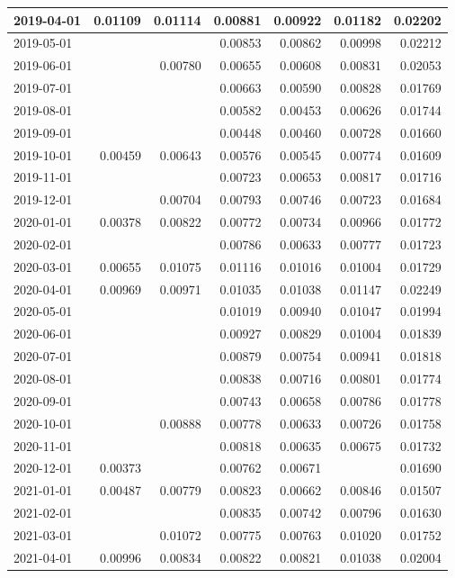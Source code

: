 \documentclass[
]{book}
\begin{document}
\begin{table}
\begin{tabular}[t]{l|r|r|r|r|r|r}
\hline
2019-04-01 & 0.01109 & 0.01114 & 0.00881 & 0.00922 & 0.01182 & 0.02202\\
\hline
2019-05-01 &  &  & 0.00853 & 0.00862 & 0.00998 & 0.02212\\
\hline
2019-06-01 &  & 0.00780 & 0.00655 & 0.00608 & 0.00831 & 0.02053\\
\hline
2019-07-01 &  &  & 0.00663 & 0.00590 & 0.00828 & 0.01769\\
\hline
2019-08-01 &  &  & 0.00582 & 0.00453 & 0.00626 & 0.01744\\
\hline
2019-09-01 &  &  & 0.00448 & 0.00460 & 0.00728 & 0.01660\\
\hline
2019-10-01 & 0.00459 & 0.00643 & 0.00576 & 0.00545 & 0.00774 & 0.01609\\
\hline
2019-11-01 &  &  & 0.00723 & 0.00653 & 0.00817 & 0.01716\\
\hline
2019-12-01 &  & 0.00704 & 0.00793 & 0.00746 & 0.00723 & 0.01684\\
\hline
2020-01-01 & 0.00378 & 0.00822 & 0.00772 & 0.00734 & 0.00966 & 0.01772\\
\hline
2020-02-01 &  &  & 0.00786 & 0.00633 & 0.00777 & 0.01723\\
\hline
2020-03-01 & 0.00655 & 0.01075 & 0.01116 & 0.01016 & 0.01004 & 0.01729\\
\hline
2020-04-01 & 0.00969 & 0.00971 & 0.01035 & 0.01038 & 0.01147 & 0.02249\\
\hline
2020-05-01 &  &  & 0.01019 & 0.00940 & 0.01047 & 0.01994\\
\hline
2020-06-01 &  &  & 0.00927 & 0.00829 & 0.01004 & 0.01839\\
\hline
2020-07-01 &  &  & 0.00879 & 0.00754 & 0.00941 & 0.01818\\
\hline
2020-08-01 &  &  & 0.00838 & 0.00716 & 0.00801 & 0.01774\\
\hline
2020-09-01 &  &  & 0.00743 & 0.00658 & 0.00786 & 0.01778\\
\hline
2020-10-01 &  & 0.00888 & 0.00778 & 0.00633 & 0.00726 & 0.01758\\
\hline
2020-11-01 &  &  & 0.00818 & 0.00635 & 0.00675 & 0.01732\\
\hline
2020-12-01 & 0.00373 &  & 0.00762 & 0.00671 &  & 0.01690\\
\hline
2021-01-01 & 0.00487 & 0.00779 & 0.00823 & 0.00662 & 0.00846 & 0.01507\\
\hline
2021-02-01 &  &  & 0.00835 & 0.00742 & 0.00796 & 0.01630\\
\hline
2021-03-01 &  & 0.01072 & 0.00775 & 0.00763 & 0.01020 & 0.01752\\
\hline
2021-04-01 & 0.00996 & 0.00834 & 0.00822 & 0.00821 & 0.01038 & 0.02004\\
\hline
\end{tabular}
\end{table}
\end{document}
